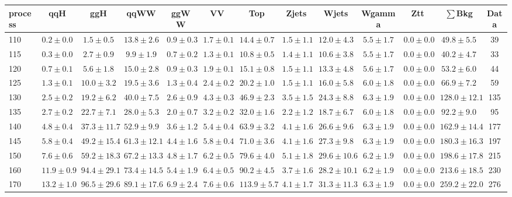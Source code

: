 \begin{table}
{%
 \tiny
 \begin{center}
 \begin{tabular}{l | c c | c c c c c c c c  | c c}
 \hline
 process & qqH & ggH & qqWW & ggWW & VV & Top & Zjets & Wjets & Wgamma & Ztt & $\sum$Bkg & Data \\
 \hline
110 & $0.2\pm0.0$ & $1.5\pm0.5$ & $13.8\pm2.6$ & $0.9\pm0.3$ & $1.7\pm0.1$ & $14.4\pm0.7$ & $1.5\pm1.1$ & $12.0\pm4.3$ & $5.5\pm1.7$ & $0.0\pm0.0$ & $49.8\pm5.5$ & 39 \\
115 & $0.3\pm0.0$ & $2.7\pm0.9$ & $9.9\pm1.9$ & $0.7\pm0.2$ & $1.3\pm0.1$ & $10.8\pm0.5$ & $1.4\pm1.1$ & $10.6\pm3.8$ & $5.5\pm1.7$ & $0.0\pm0.0$ & $40.2\pm4.7$ & 33 \\
120 & $0.7\pm0.1$ & $5.6\pm1.8$ & $15.0\pm2.8$ & $0.9\pm0.3$ & $1.9\pm0.1$ & $15.1\pm0.8$ & $1.5\pm1.1$ & $13.3\pm4.8$ & $5.6\pm1.7$ & $0.0\pm0.0$ & $53.2\pm6.0$ & 44 \\
125 & $1.3\pm0.1$ & $10.0\pm3.2$ & $19.5\pm3.6$ & $1.3\pm0.4$ & $2.4\pm0.2$ & $20.2\pm1.0$ & $1.5\pm1.1$ & $16.0\pm5.8$ & $6.0\pm1.8$ & $0.0\pm0.0$ & $66.9\pm7.2$ & 59 \\
130 & $2.5\pm0.2$ & $19.2\pm6.2$ & $40.0\pm7.5$ & $2.6\pm0.9$ & $4.3\pm0.3$ & $46.9\pm2.3$ & $3.5\pm1.5$ & $24.3\pm8.8$ & $6.3\pm1.9$ & $0.0\pm0.0$ & $128.0\pm12.1$ & 135 \\
135 & $2.7\pm0.2$ & $22.7\pm7.1$ & $28.0\pm5.3$ & $2.0\pm0.7$ & $3.2\pm0.2$ & $32.0\pm1.6$ & $2.2\pm1.2$ & $18.7\pm6.7$ & $6.0\pm1.8$ & $0.0\pm0.0$ & $92.2\pm9.0$ & 95 \\
140 & $4.8\pm0.4$ & $37.3\pm11.7$ & $52.9\pm9.9$ & $3.6\pm1.2$ & $5.4\pm0.4$ & $63.9\pm3.2$ & $4.1\pm1.6$ & $26.6\pm9.6$ & $6.3\pm1.9$ & $0.0\pm0.0$ & $162.9\pm14.4$ & 177 \\
145 & $5.8\pm0.4$ & $49.2\pm15.4$ & $61.3\pm12.1$ & $4.4\pm1.6$ & $5.8\pm0.4$ & $71.0\pm3.6$ & $4.1\pm1.6$ & $27.3\pm9.8$ & $6.3\pm1.9$ & $0.0\pm0.0$ & $180.3\pm16.3$ & 197 \\
150 & $7.6\pm0.6$ & $59.2\pm18.3$ & $67.2\pm13.3$ & $4.8\pm1.7$ & $6.2\pm0.5$ & $79.6\pm4.0$ & $5.1\pm1.8$ & $29.6\pm10.6$ & $6.2\pm1.9$ & $0.0\pm0.0$ & $198.6\pm17.8$ & 215 \\
160 & $11.9\pm0.9$ & $94.4\pm29.1$ & $73.4\pm14.5$ & $5.4\pm1.9$ & $6.4\pm0.5$ & $90.2\pm4.5$ & $3.7\pm1.6$ & $28.2\pm10.1$ & $6.2\pm1.9$ & $0.0\pm0.0$ & $213.6\pm18.5$ & 230 \\
170 & $13.2\pm1.0$ & $96.5\pm29.6$ & $89.1\pm17.6$ & $6.9\pm2.4$ & $7.6\pm0.6$ & $113.9\pm5.7$ & $4.1\pm1.7$ & $31.3\pm11.3$ & $6.3\pm1.9$ & $0.0\pm0.0$ & $259.2\pm22.0$ & 276 \\

\end{tabular}
\end{center}}
\end{table}
